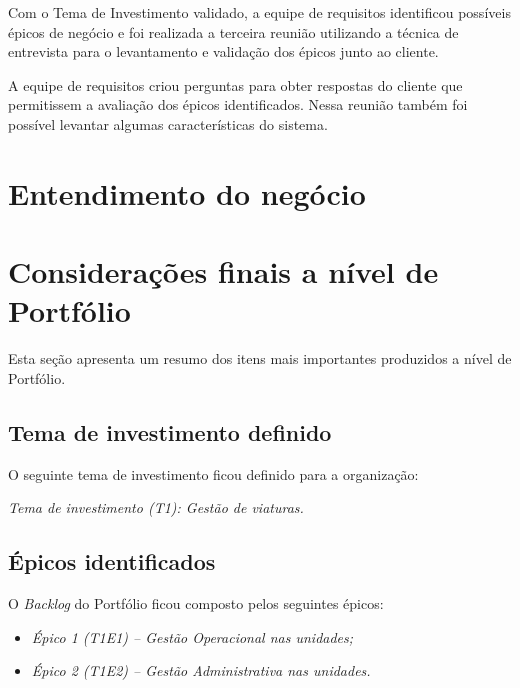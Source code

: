       Com o Tema de Investimento validado, a equipe de requisitos identificou possíveis épicos de negócio e foi realizada a terceira
      reunião utilizando a técnica de entrevista para o levantamento e validação dos épicos junto ao cliente.
      
      A equipe de requisitos criou perguntas para obter respostas do cliente que permitissem a avaliação dos épicos identificados.
      Nessa reunião também foi possível levantar algumas características do sistema.
    
  \section{Entendimento do negócio}
  
    
  
  \section{Considerações finais a nível de Portfólio}
    
    Esta seção apresenta um resumo dos itens mais importantes produzidos a nível de Portfólio.
    
    \subsection{Tema de investimento definido}
      
      O seguinte tema de investimento ficou definido para a organização:
      
      \emph{Tema de investimento (T1): Gestão de viaturas.}
    
    \subsection{Épicos identificados}
      
      O \textit{Backlog} do Portfólio ficou composto pelos seguintes épicos:
      
      \begin{itemize}
      \item \emph{Épico 1 (T1E1) – Gestão Operacional nas unidades;}
      \item \emph{Épico 2 (T1E2) – Gestão Administrativa nas unidades.}
      \end{itemize}

    
